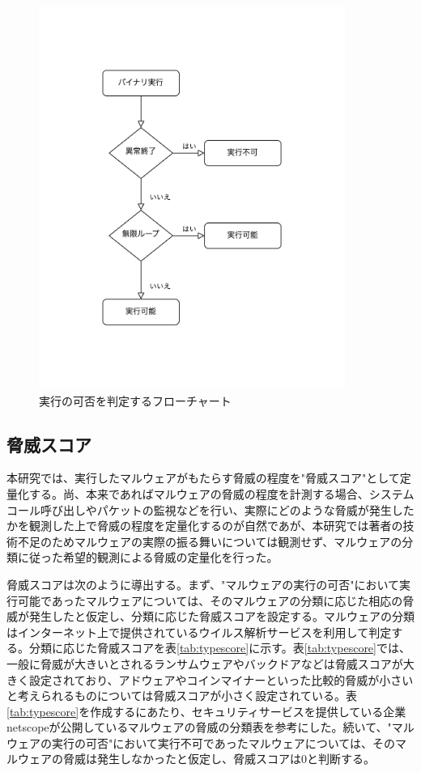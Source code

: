 \documentclass[12pt,a4paper,titlepage,report]{jsbook}
\begin{document}
\begin{figure}[htbp]
	\begin{center}
		\includegraphics[width=10cm]{img/execflow.png}
		\caption{実行の可否を判定するフローチャート}
		\label{fig:execflow}
	\end{center}
\end{figure}

\subsection{脅威スコア}
本研究では、実行したマルウェアがもたらす脅威の程度を"脅威スコア"として定量化する。尚、本来であればマルウェアの脅威の程度を計測する場合、システムコール呼び出しやパケットの監視などを行い、実際にどのような脅威が発生したかを観測した上で脅威の程度を定量化するのが自然であが、本研究では著者の技術不足のためマルウェアの実際の振る舞いについては観測せず、マルウェアの分類に従った希望的観測による脅威の定量化を行った。

脅威スコアは次のように導出する。まず、"マルウェアの実行の可否"において実行可能であったマルウェアについては、そのマルウェアの分類に応じた相応の脅威が発生したと仮定し、分類に応じた脅威スコアを設定する。マルウェアの分類はインターネット上で提供されているウイルス解析サービスを利用して判定する。分類に応じた脅威スコアを表\ref{tab:typescore}に示す。表\ref{tab:typescore}では、一般に脅威が大きいとされるランサムウェアやバックドアなどは脅威スコアが大きく設定されており、アドウェアやコインマイナーといった比較的脅威が小さいと考えられるものについては脅威スコアが小さく設定されている。表\ref{tab:typescore}を作成するにあたり、セキュリティサービスを提供している企業netscopeが公開しているマルウェアの脅威の分類表\cite{malwareclass}を参考にした。続いて、"マルウェアの実行の可否"において実行不可であったマルウェアについては、そのマルウェアの脅威は発生しなかったと仮定し、脅威スコアは0と判断する。
\end{document}
